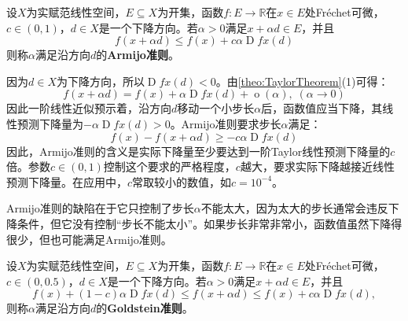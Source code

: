 \begin{definition}
	设$X$为实赋范线性空间，$E\subseteq X$为开集，函数$f:E\to\mathbb{R}$在$x\in E$处Fr\'echet可微，$c\in(0,1)$，$d\in X$是一个下降方向。若$\alpha>0$满足$x+\alpha d\in E$，并且
	\begin{equation*}
		f(x+\alpha d)\leqslant f(x)+c\alpha\operatorname{D}fx(d)
	\end{equation*}
	则称$\alpha$满足沿方向$d$的\textbf{Armijo准则}。
\end{definition}
\begin{note}
	因为$d\in X$为下降方向，所以$\operatorname{D}fx(d)<0$。由\cref{theo:TaylorTheorem}(1)可得：
	\begin{equation*}
		f(x+\alpha d)=f(x)+\alpha\operatorname{D}fx(d)+\operatorname{o}(\alpha),\;(\alpha\to0)
	\end{equation*}
	因此一阶线性近似预示着，沿方向$d$移动一个小步长$\alpha$后，函数值应当下降，其线性预测下降量为$-\alpha\operatorname{D}fx(d)>0$。Armijo准则要求步长$\alpha$满足：
	\begin{equation*}
		f(x)-f(x+\alpha d)\geqslant-c\alpha\operatorname{D}fx(d)
	\end{equation*}
	因此，Armijo准则的含义是实际下降量至少要达到一阶Taylor线性预测下降量的$c$倍。参数$c\in(0,1)$控制这个要求的严格程度，$c$越大，要求实际下降越接近线性预测下降量。在应用中，$c$常取较小的数值，如$c=10^{-4}$。\par
	Armijo准则的缺陷在于它只控制了步长$\alpha$不能太大，因为太大的步长通常会违反下降条件，但它没有控制“步长不能太小”。如果步长非常非常小，函数值虽然下降得很少，但也可能满足Armijo准则。
\end{note}
\begin{definition}
	设$X$为实赋范线性空间，$E\subseteq X$为开集，函数$f:E\to\mathbb{R}$在$x\in E$处Fr\'echet可微，$c\in(0,0.5)$，$d\in X$是一个下降方向。若$\alpha>0$满足$x+\alpha d\in E$，并且
	\begin{equation*}
		f(x)+(1-c)\alpha\operatorname{D}fx(d)
		\leqslant
		f(x+\alpha d)
		\leqslant
		f(x)+c\alpha\operatorname{D}fx(d),
	\end{equation*}
	则称$\alpha$满足沿方向$d$的\textbf{Goldstein准则}。
\end{definition}
